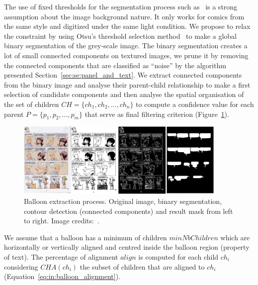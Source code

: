 The use of fixed thresholds for the segmentation process such as~\cite{Arai11} is a strong assumption about the image background nature.
It only works for comics from the same style and digitized under the same light condition.
We propose to relax the constraint by using Otsu's threshold selection method~\cite{otsu79} to make a global binary segmentation of the grey-scale image.
The binary segmentation creates a lot of small connected components on textured images, we prune it by removing the connected components that are classified as ``noise'' by the algorithm presented Section~\ref{sec:se:panel_and_text}.
We extract connected components from the binary image and analyse their parent-child relationship to make a first selection of candidate components and then analyse the spatial organisation of the set of children $CH=\{ch_1, ch_2,...,ch_n\}$ to compute a confidence value for each parent $P=\{p_1, p_2,...,p_m\}$ that serve as final filtering criterion (Figure~\ref{fig:in:balloon_binarisation}).

 \begin{figure}[!ht]  %
   \centering
  \includegraphics[width=0.9\textwidth]{closed_balloon_process.png}
  \caption[Balloon extraction process]{Balloon extraction process. Original image, binary segmentation, contour detection (connected components) and result mask from left to right. Image credits:~\cite{Midam01}.}
  \label{fig:in:balloon_binarisation}
 \end{figure}

We assume that a balloon has a minimum of children $minNbChildren$ which are horizontally or vertically aligned and centred inside the balloon region (property of text).
The percentage of alignment $align$ is computed for each child $ch_i$ considering $CHA(ch_i)$ the subset of children that are aligned to $ch_i$ (Equation~\ref{eq:in:balloon_alignment}).


